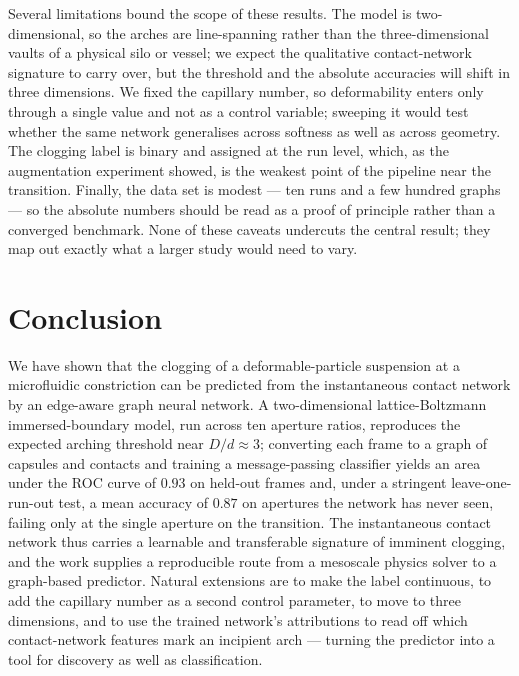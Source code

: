 \documentclass[11pt,a4paper]{article}
\begin{document}
Several limitations bound the scope of these results. The model is
two-dimensional, so the arches are line-spanning rather than the
three-dimensional vaults of a physical silo or vessel; we expect the
qualitative contact-network signature to carry over, but the threshold
and the absolute accuracies will shift in three dimensions. We fixed the
capillary number, so deformability enters only through a single value
and not as a control variable; sweeping it would test whether the same
network generalises across softness as well as across geometry. The
clogging label is binary and assigned at the run level, which, as the
augmentation experiment showed, is the weakest point of the pipeline
near the transition. Finally, the data set is modest --- ten runs and a
few hundred graphs --- so the absolute numbers should be read as a
proof of principle rather than a converged benchmark. None of these
caveats undercuts the central result; they map out exactly what a larger
study would need to vary.

\section{Conclusion}
\label{sec:conclusion}

We have shown that the clogging of a deformable-particle suspension at a
microfluidic constriction can be predicted from the instantaneous
contact network by an edge-aware graph neural network. A
two-dimensional lattice-Boltzmann immersed-boundary model, run across
ten aperture ratios, reproduces the expected arching threshold near
$D/d\approx 3$; converting each frame to a graph of capsules and
contacts and training a message-passing classifier yields an area under
the ROC curve of $0.93$ on held-out frames and, under a stringent
leave-one-run-out test, a mean accuracy of $0.87$ on apertures the
network has never seen, failing only at the single aperture on the
transition. The instantaneous contact network thus carries a learnable
and transferable signature of imminent clogging, and the work supplies a
reproducible route from a mesoscale physics solver to a graph-based
predictor. Natural extensions are to make the label continuous, to add
the capillary number as a second control parameter, to move to three
dimensions, and to use the trained network's attributions to read off
which contact-network features mark an incipient arch --- turning the
predictor into a tool for discovery as well as classification.
\end{document}
